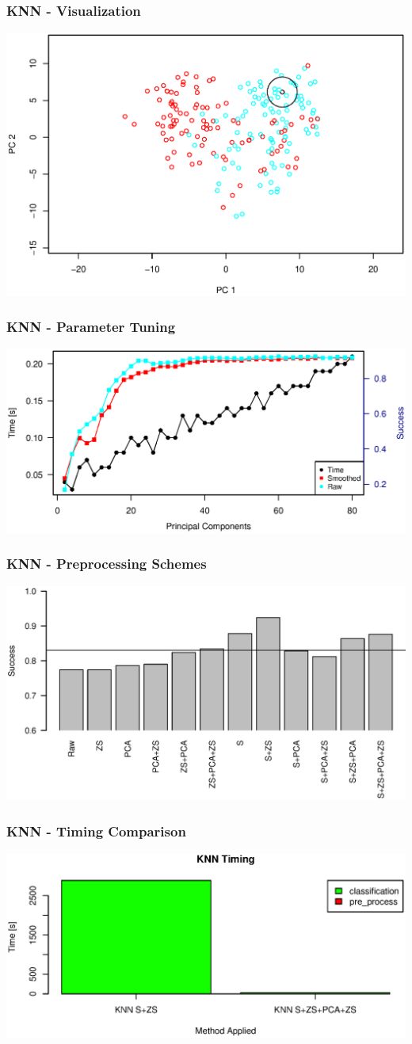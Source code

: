 \begin{frame}
\frametitle{KNN - Visualization}
\includegraphics[width = 0.9 \textwidth]{graphics/knn_vis}
\end{frame}

\begin{frame}
\frametitle{KNN - Parameter Tuning}
\includegraphics[width = 0.9 \textwidth]{../Report/graphics/knn_pc}
\end{frame}

\begin{frame}
\frametitle{KNN - Preprocessing Schemes}
\includegraphics[width = 0.9 \textwidth]{../Report/graphics/knn_zscore_3}
\end{frame}

\begin{frame}
\frametitle{KNN - Timing Comparison}
\includegraphics[width = 0.9 \textwidth]{../Report/graphics/compare_timing_knn_smoothVSpca}
\end{frame}
